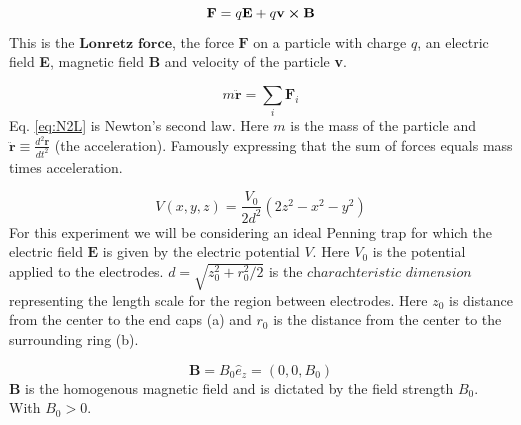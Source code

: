 \documentclass[english,notitlepage,reprint,nofootinbib]{revtex4-1}  %
\begin{document}
\begin{equation}\label{eq:lorentz}
    \textbf{F} = q\textbf{E} + q \textbf{v} \cross \textbf{B}
\end{equation}
This is the $\textbf{Lonretz force}$, the force $\textbf{F}$ on a particle 
with charge $q$, an electric field \textbf{E}, magnetic field \textbf{B} and velocity of the particle \textbf{v}.

\begin{equation}\label{eq:N2L}
    m \ddot{\textbf{r}} = \sum_i \textbf{F}_i
\end{equation}
Eq. \ref*{eq:N2L} is Newton's second law. Here $m$ is the mass of the particle and $\ddot{\textbf{r}} \equiv \frac{d^2 \textbf{r}}{dt^2}$ (the acceleration). 
Famously expressing that the sum of forces equals mass times acceleration.

\begin{equation}\label{eq:el_potential}
    V(x,y,z) = \frac{V_0}{2d^2} (2z^2 - x^2 - y^2)
\end{equation}
For this experiment we will be considering an ideal Penning trap for which the electric field $\textbf{E}$ is given by the electric potential $V$. 
Here $V_0$ is the potential applied to the electrodes. $d = \sqrt{z_0^2 + r_0^2 / 2}$ is the $\textit{charachteristic dimension}$ representing the length scale 
for the region between electrodes. Here $z_0$ is distance from the center to the end caps (a) and $r_0$ is the distance from the center 
to the surrounding ring (b).

\begin{equation}\label{eq:mag_field}
    \textbf{B} = B_0 \hat{e}_z = (0,0,B_0)
\end{equation}
$\textbf{B}$ is the homogenous magnetic field and is dictated by the field strength $B_0$. With $B_0 > 0$. 
\end{document}
